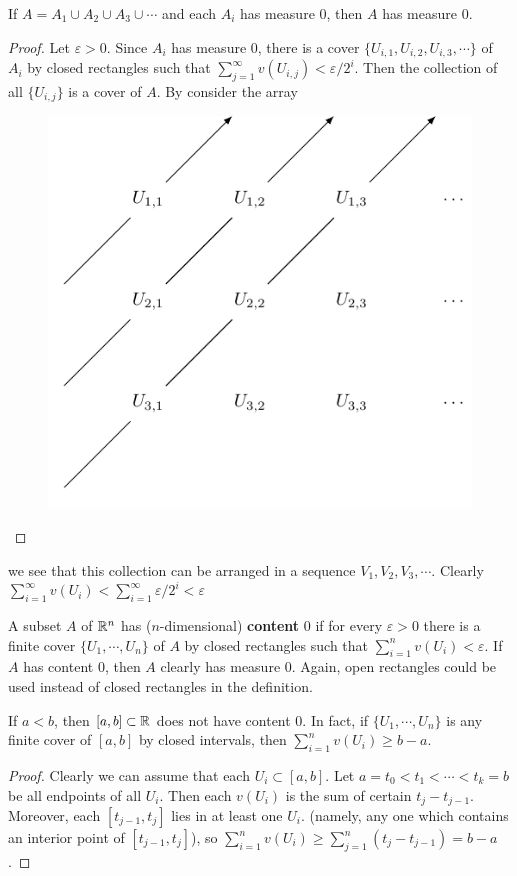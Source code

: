 \begin{theorem}
    If $A = A_1\cup A_2 \cup A_3\cup \cdots$ and each $A_i$ has measure 0, then $A$ has measure 0.
\end{theorem}

\begin{proof}
    Let $\varepsilon>0$. Since $A_i$ has measure 0, there is a cover $\{U_{i,1}, U_{i,2}, U_{i,3}, \cdots \}$ 
    of $A_i$ by closed rectangles such that $\sum_{j=1}^{\infty}{v(U_{i,j})}< \varepsilon/2^i$. 
    Then the collection of all $\{U_{i,j}\}$ is a cover of $A$. By consider the array
    \begin{figure}[!htb]
        \centering
        \includegraphics[width=.6\linewidth]{./pics/Fig3-(2).pdf}
    \end{figure}
\end{proof}

we see that this collection can be arranged in a sequence  
$V_1, V_2, V_3,\cdots$. Clearly $\sum_{i=1}^{\infty}{v(U_i)}
<\sum_{i=1}^{\infty}{\varepsilon/2^i}<\varepsilon$

A subset $A$ of $\mathbb{R}^n$ has ($n$-dimensional) \textbf{content} 0 if for every 
$\varepsilon>0$ there is a finite cover $\{U_1, \cdots, U_n\}$ of $A$ by closed 
rectangles such that $\sum_{i=1}^{n}{v(U_i)}<\varepsilon$. If $A$ has content 0,
then $A$ clearly has measure 0. Again, open rectangles could be used instead of 
closed rectangles in the definition.

\begin{theorem}
    If $a<b$, then $[a, b]\subset \mathbb{R}$ does not have content 0.
    In fact, if $\{U_1, \cdots, U_n\}$ is any finite cover of $[a, b]$ by closed
    intervals, then $\sum_{i=1}^{n}{v(U_i)}\ge b-a$.  
\end{theorem}

\begin{proof}
    Clearly we can assume that each $U_i\subset [a, b]$. Let 
    $a=t_0<t_1<\cdots<t_k=b$ be all endpoints of all $U_i$.
    Then each $v(U_i)$ is the sum of certain $t_j-t_{j-1}$.
    Moreover, each $[t_{j-1}, t_j]$ lies in at least one $U_i$.
    (namely, any one which contains an  interior point of $[t_{j-1}, t_j]$),
    so $\sum_{i=1}^{n}{v(U_i)} \ge \sum_{j=1}^{n}{(t_j-t_{j-1})} = b-a$.
\end{proof}

